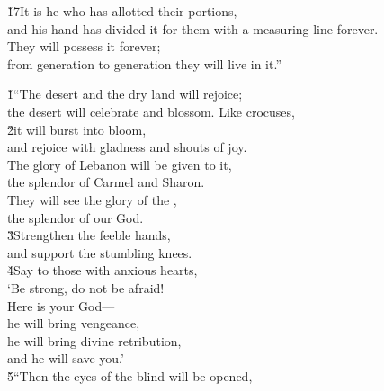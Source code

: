 \begin{poetry}
\poeml \v{17}It is he who has allotted their portions, \\
\poemll    and his hand has divided it for them with a measuring line forever. \\
\poeml They will possess it forever; \\
\poemll    from generation to generation they will live in it.''
\end{poetry}

\begin{poetry}
\poeml {}
\v{1}``The desert and the dry land will rejoice; \\
\poemll    the desert will celebrate and blossom. Like crocuses, \\
\poeml \v{2}it will burst into bloom, \\
\poemll    and rejoice with gladness and shouts of joy. \\
\poeml The glory of Lebanon will be given to it, \\
\poemll    the splendor of Carmel and Sharon. \\
\poeml They will see the glory of the , \\
\poemll    the splendor of our God. \\
\poeml \v{3}Strengthen the feeble hands, \\
\poemll    and support the stumbling knees. \\
\poeml \v{4}Say to those with anxious hearts, \\
\poemll    `Be strong, do not be afraid! \\
\poeml Here is your God--- \\
\poemll    he will bring vengeance, \\
\poeml he will bring divine retribution, \\
\poemll    and he will save you.' \\
\poeml \v{5}``Then the eyes of the blind will be opened, \\

\end{poetry}
